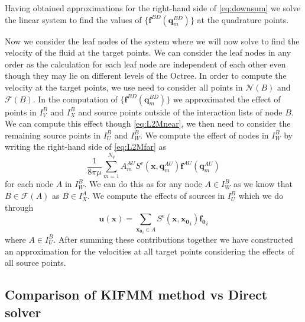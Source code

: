 Having obtained approximations for the right-hand side of \cref{eq:downsum} we solve the linear system to find the values of $\{\mathbf{f}^{BD}(\mathbf{q}^{BD}_m)\}$ at the quadrature points.

Now we consider the leaf nodes of the system where we will now solve to find the velocity of the fluid at the target points. We can consider the leaf nodes in any order as the calculation for each leaf node are independent of each other even though they may lie on different levels of the Octree. In order to compute the velocity at the target points, we use need to consider all points in $\mathcal{N}(B)$ and $\mathcal{F}(B)$. In the computation of  $\{\mathbf{f}^{BD}(\mathbf{q}^{BD}_m)\}$ we approximated the effect of points in $I_V^B$ and $I_X^B$ and source points outside of the interaction lists of node $B$. We can compute this effect though \cref{eq:L2Mnear}, we then need to consider the remaining source points in $I_U^B$ and $I_W^B$. We compute the effect of nodes in $I_W^B$ by writing the right-hand side of \cref{eq:L2Mfar} as 
\begin{equation*}
    \frac{1}{8 \pi \mu} \sum_{m=1}^{N_{q}} A_{m}^{AU} S^\epsilon\left(\mathbf{x}, \mathbf{q}_{m}^{A U}\right) \mathbf{f}^{A U}\left(\mathbf{q}_{m}^{A U}\right)
\end{equation*}
for each node $A$ in $I_W^B$. We can do this as for any node $A \in I_W^B$ as we know that $B\in\mathcal{F}(A)$ as $B\in I_X^A$. We compute the effects of sources in $I_U^B$ which we do through 
\begin{equation*}
    \mathbf{u}(\mathbf{x}) = \sum_{\mathbf{x_0}_i\in A} S^\epsilon(\mathbf{x},\mathbf{x_{0}}_i)\mathbf{f_{0}}_i
\end{equation*}
where $A \in I_U^B$. After summing these contributions together we have constructed an approximation for the velocities at all target points considering the effects of all source points.

\subsection{Comparison of KIFMM method vs Direct solver}